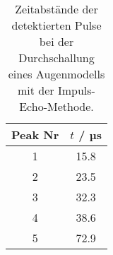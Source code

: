 \begin{table}[!htp]
\centering
\caption{Zeitabstände der detektierten Pulse bei der Durchschallung eines Augenmodells mit der Impuls-Echo-Methode.}
\label{tab:auge}
\begin{tabular}{S[table-format=1.0] S[table-format=2.1]}
\toprule
{Peak Nr} & {$t$ / µs} \\
 & 15.8 \\
2 & 23.5 \\
3 & 32.3 \\
4 & 38.6 \\
5 & 72.9 \\
\bottomrule
\end{tabular}
\end{table}